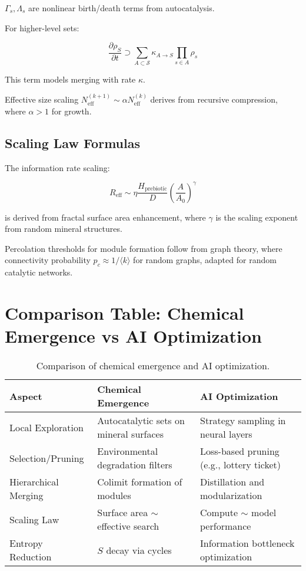 \documentclass{book}
\begin{document}
$\Gamma_s, \Lambda_s$ are nonlinear birth/death terms from autocatalysis.

For higher-level sets:

\[\frac{\partial \rho_S}{\partial t} \supset \sum_{A \subset \mathcal{S}} \kappa_{A \to S} \prod_{s \in A} \rho_s\]

This term models merging with rate $\kappa$.

Effective size scaling $N_{\mathrm{eff}}^{(k+1)} \sim \alpha N_{\mathrm{eff}}^{(k)}$ derives from recursive compression, where $\alpha > 1$ for growth.

\section{Scaling Law Formulas}
The information rate scaling:

\[R_{\mathrm{eff}} \sim \eta \frac{H_{\mathrm{prebiotic}}}{D} \left( \frac{A}{A_0} \right)^\gamma\]

is derived from fractal surface area enhancement, where $\gamma$ is the scaling exponent from random mineral structures.

Percolation thresholds for module formation follow from graph theory, where connectivity probability $p_c \approx 1 / \langle k \rangle$ for random graphs, adapted for random catalytic networks.

\chapter{Comparison Table: Chemical Emergence vs AI Optimization}
\begin{table}[h]
\centering
\begin{tabular}{lll}
\toprule
Aspect & Chemical Emergence & AI Optimization \\
\midrule
Local Exploration & Autocatalytic sets on mineral surfaces & Strategy sampling in neural layers \\
Selection/Pruning & Environmental degradation filters & Loss-based pruning (e.g., lottery ticket) \\
Hierarchical Merging & Colimit formation of modules & Distillation and modularization \\
Scaling Law & Surface area $\sim$ effective search & Compute $\sim$ model performance \\
Entropy Reduction & $S$ decay via cycles & Information bottleneck optimization \\
\bottomrule
\end{tabular}
\caption{Comparison of chemical emergence and AI optimization.}
\end{table}



\end{document}
